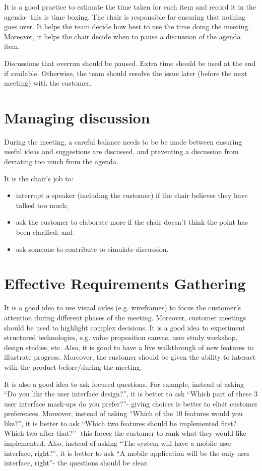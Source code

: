 \documentclass[a4paper, openany]{memoir}
\begin{document}
It is a good practice to estimate the time taken for each item and record it in the agenda- this is time boxing. The chair is responsible for ensuring that nothing goes over. It helps the team decide how best to use the time doing the meeting. Moreover, it helps the chair decide when to pause a discussion of the agenda item. 

Discussions that overrun should be paused. Extra time should be used at the end if available. Otherwise, the team should resolve the issue later (before the next meeting) with the customer.

\section{Managing discussion}
During the meeting, a careful balance needs to be be made between ensuring useful ideas and suggestions are discussed, and preventing a discussion from deviating too much from the agenda.

It is the chair's job to:
\begin{itemize}
    \item interrupt a speaker (including the customer) if the chair believes they have talked too much;
    \item ask the customer to elaborate more if the chair doesn't think the point has been clarified; and
    \item ask someone to contribute to simulate discussion.
\end{itemize}

\section{Effective Requirements Gathering}
It is a good idea to use visual aides (e.g. wireframes) to focus the customer's attention during different phases of the meeting. Moreover, customer meetings should be used to highlight complex decisions. It is a good idea to experiment structured technologies, e.g. value proposition canvas, user study workshop, design studies, etc. Also, it is good to have a live walkthrough of new features to illustrate progress. Moreover, the customer should be given the ability to interact with the product before/during the meeting.

It is also a good idea to ask focused questions. For example, instead of asking ``Do you like the user interface design?'', it is better to ask ``Which part of these 3 user interface mask-ups do you prefer?''- giving choices is better to elicit customer preferences. Moreover, instead of asking ``Which of the 10 features would you like?'', it is better to ask ``Which two features should be implemented first? Which two after that?''- this forces the customer to rank what they would like implemented. Also, instead of asking ``The system will have a mobile user interface, right?'', it is better to ask ``A mobile application will be the only user interface, right''- the questions should be clear.
\end{document}
